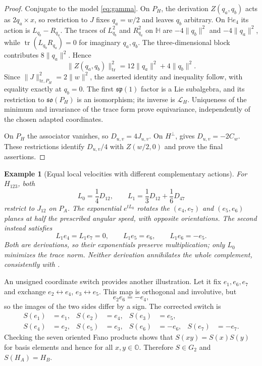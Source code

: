 \documentclass[11pt,a4paper]{article}
\newtheorem{example}[example]{Example}
\newcommand{\HH}{\mathbb H}
\newcommand{\OO}{\mathbb O}
\begin{document}
\begin{proof}
Conjugate to the model \eqref{eq:gamma}.  On $P_H$, the derivation $Z(q_a,q_b)$ acts as $2q_a\times x$, so restriction to $J$ fixes $q_a=w/2$ and leaves $q_b$ arbitrary.  On $\HH e_4$ its action is $L_{q_b}-R_{q_a}$.  The traces of $L_{q_b}^2$ and $R_{q_a}^2$ on $\HH$ are $-4\|q_b\|^2$ and $-4\|q_a\|^2$, while $\operatorname{tr}(L_{q_b}R_{q_a})=0$ for imaginary $q_a,q_b$.  The three-dimensional block contributes $8\|q_a\|^2$.  Hence
\[
\|Z(q_a,q_b)\|_{\mathrm{tr}}^2=12\|q_a\|^2+4\|q_b\|^2.
\]
Since $\|J\|_{\mathrm{tr},P_H}^2=2\|w\|^2$, the asserted identity and inequality follow, with equality exactly at $q_b=0$.  The first $\mathfrak{sp}(1)$ factor is a Lie subalgebra, and its restriction to $\mathfrak{so}(P_H)$ is an isomorphism; its inverse is $\mathcal L_H$.  Uniqueness of the minimum and invariance of the trace form prove equivariance, independently of the chosen adapted coordinates.

On $P_H$ the associator vanishes, so $D_{u,v}=4J_{u,v}$.  On $H^\perp$,  gives $D_{u,v}=-2C_w$.  These restrictions identify $D_{u,v}/4$ with $Z(w/2,0)$ and prove the final assertions.
\end{proof}

\begin{example}[Equal local velocities with different complementary actions]
For $H_{123}$, both
\[
L_0=\frac14D_{12},\qquad L_1=\frac13D_{12}+\frac16D_{47}
\]
restrict to $J_{12}$ on $P_A$.  The exponential $e^{tL_0}$ rotates the $(e_4,e_7)$ and $(e_5,e_6)$ planes at half the prescribed angular speed, with opposite orientations.  The second instead satisfies
\[
L_1e_4=L_1e_7=0,\qquad L_1e_5=e_6,\qquad L_1e_6=-e_5.
\]
Both are derivations, so their exponentials preserve multiplication; only $L_0$ minimizes the trace norm.  Neither derivation annihilates the whole complement, consistently with .
\end{example}

An unsigned coordinate switch provides another illustration.  Let it fix $e_1,e_6,e_7$ and exchange $e_2\leftrightarrow e_4$, $e_3\leftrightarrow e_5$.  This map is orthogonal and involutive, but
\[
e_2e_6=-e_4,
\]
so the images of the two sides differ by a sign.  The corrected switch is
\begin{equation}
\begin{aligned}
S(e_1)&=e_1,&S(e_2)&=e_4,&S(e_3)&=e_5,\\
S(e_4)&=e_2,&S(e_5)&=e_3,&S(e_6)&=-e_6,&S(e_7)&=-e_7.
\end{aligned}
\label{eq:switch}
\end{equation}
Checking the seven oriented Fano products shows that $S(xy)=S(x)S(y)$ for basis elements and hence for all $x,y\in\OO$.  Therefore $S\in G_2$ and $S(H_A)=H_B$.
\end{document}
